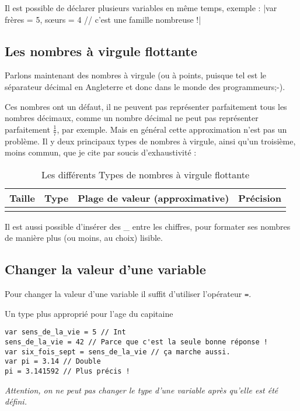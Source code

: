 Il est possible de déclarer plusieurs variables en même temps, exemple :
|var frères = 5, sœurs = 4 // c'est une famille nombreuse !|

\subsection{Les nombres à virgule flottante}

Parlons maintenant des nombres à virgule (ou à points, puisque tel est le séparateur décimal en Angleterre et donc dans le monde des programmeurs;-).

Ces nombres ont un  défaut,
il ne peuvent pas représenter parfaitement tous les nombres décimaux,
comme un nombre décimal ne peut pas représenter parfaitement
\begin{math} \frac{1}{7} \end{math}, par exemple.
Mais en général cette approximation n'est pas un problème.
Il y deux principaux types de nombres à virgule, ainsi qu'un troisième,
moins commun, que je cite par soucis d'exhaustivité :
\begin{longtabu} to \linewidth {|X[3,l,m]|X[1,l,m]|X[4,r,m]|X[3,r,m]|}
\hline Taille & Type & Plage de valeur (approximative) & Précision \\ \hline
\endhead

\caption{Les différents Types de nombres à virgule flottante}
\end{longtabu}

Il est aussi possible d'insérer des \_ entre les chiffres,
pour formater ses nombres de manière plus (ou moins, au choix) lisible.

\subsection{Changer la valeur d'une variable}
Pour changer la valeur d'une variable il suffit d'utiliser l'opérateur \verb"=".
\begin{listing}[h]
\caption{Un type plus approprié pour l'age du capitaine}
\begin{verbatim}
var sens_de_la_vie = 5 // Int
sens_de_la_vie = 42 // Parce que c'est la seule bonne réponse !
var six_fois_sept = sens_de_la_vie // ça marche aussi.
var pi = 3.14 // Double
pi = 3.141592 // Plus précis !
\end{verbatim}
\end{listing}

\emph{Attention, on ne peut pas changer le type d'une variable après qu'elle est été défini.}
